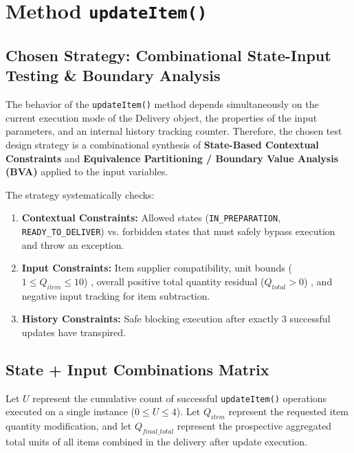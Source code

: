\documentclass[11pt, a4paper]{article}
\newcommand{\code}[1]{\texttt{#1}}
\newcommand{\classname}[1]{\textsf{#1}}
\newcommand{\methodname}[1]{\texttt{#1()}}
\begin{document}
\section{Method \methodname{updateItem}}
\label{sec:updateitem}

\subsection{Chosen Strategy: Combinational State-Input Testing \& Boundary Analysis}
The behavior of the \methodname{updateItem} method depends simultaneously on the current execution mode of the \classname{Delivery} object, the properties of the input parameters, and an internal history tracking counter. Therefore, the chosen test design strategy is a combinational synthesis of \textbf{State-Based Contextual Constraints} and \textbf{Equivalence Partitioning / Boundary Value Analysis (BVA)} applied to the input variables.

The strategy systematically checks:
\begin{enumerate}
    \item \textbf{Contextual Constraints:} Allowed states (\code{IN\_PREPARATION}, \code{READY\_TO\_DELIVER}) vs. forbidden states that must safely bypass execution and throw an exception.
    \item \textbf{Input Constraints:} Item supplier compatibility, unit bounds ($1 \le Q_{item} \le 10$) , overall positive total quantity residual ($Q_{total} > 0$) , and negative input tracking for item subtraction.
    \item \textbf{History Constraints:} Safe blocking execution after exactly 3 successful updates have transpired.
\end{enumerate}

\subsection{State + Input Combinations Matrix}
Let $U$ represent the cumulative count of successful \methodname{updateItem} operations executed on a single instance ($0 \le U \le 4$). Let $Q_{item}$ represent the requested item quantity modification, and let $Q_{final\_total}$ represent the prospective aggregated total units of all items combined in the delivery after update execution.
\end{document}
